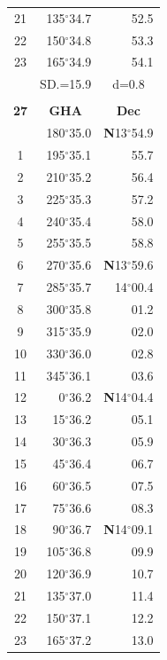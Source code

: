 \documentclass[10pt, a4paper]{report}
\begin{document}
\begin{scriptsize}
\begin{tabular*}{0.2\textwidth}[t]{@{\extracolsep{\fill}}|c|rr|}
21 & 135$^\circ$34.7 & \raisebox{0.24ex}{\boldmath$\cdot$~\boldmath$\cdot$~~}52.5\\
22 & 150$^\circ$34.8 & 53.3\\
23 & 165$^\circ$34.9 & 54.1\\
\hline
\rule{0pt}{2.4ex} & \multicolumn{1}{c}{SD.=15.9} & \multicolumn{1}{c|}{d=0.8}\\
\hline
\multicolumn{1}{c}{}\\[-0.5ex]\hline
\multicolumn{1}{|c|}{\rule{0pt}{2.6ex}\textbf{27}} & \multicolumn{1}{c}{\textbf{GHA}} & \multicolumn{1}{c|}{\textbf{Dec}}\\
\hline\rule{0pt}{2.6ex}\noindent
0 & 180$^\circ$35.0 & \textbf{N}13$^\circ$54.9\\
1 & 195$^\circ$35.1 & 55.7\\
2 & 210$^\circ$35.2 & 56.4\\
3 & 225$^\circ$35.3 & \raisebox{0.24ex}{\boldmath$\cdot$~\boldmath$\cdot$~~}57.2\\
4 & 240$^\circ$35.4 & 58.0\\
5 & 255$^\circ$35.5 & 58.8\\[2Pt]
6 & 270$^\circ$35.6 & \textbf{N}13$^\circ$59.6\\
7 & 285$^\circ$35.7 & 14$^\circ$00.4\\
8 & 300$^\circ$35.8 & 01.2\\
9 & 315$^\circ$35.9 & \raisebox{0.24ex}{\boldmath$\cdot$~\boldmath$\cdot$~~}02.0\\
10 & 330$^\circ$36.0 & 02.8\\
11 & 345$^\circ$36.1 & 03.6\\[2Pt]
12 & 0$^\circ$36.2 & \textbf{N}14$^\circ$04.4\\
13 & 15$^\circ$36.2 & 05.1\\
14 & 30$^\circ$36.3 & 05.9\\
15 & 45$^\circ$36.4 & \raisebox{0.24ex}{\boldmath$\cdot$~\boldmath$\cdot$~~}06.7\\
16 & 60$^\circ$36.5 & 07.5\\
17 & 75$^\circ$36.6 & 08.3\\[2Pt]
18 & 90$^\circ$36.7 & \textbf{N}14$^\circ$09.1\\
19 & 105$^\circ$36.8 & 09.9\\
20 & 120$^\circ$36.9 & 10.7\\
21 & 135$^\circ$37.0 & \raisebox{0.24ex}{\boldmath$\cdot$~\boldmath$\cdot$~~}11.4\\
22 & 150$^\circ$37.1 & 12.2\\
23 & 165$^\circ$37.2 & 13.0\\

\end{tabular*}
\end{scriptsize}
\end{document}
